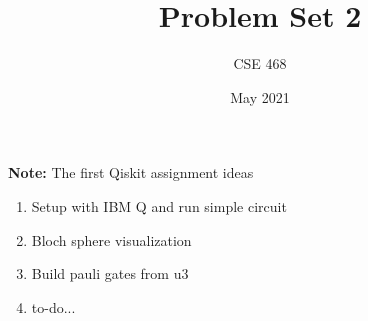 \documentclass[12pt]{article}
\title{Problem Set 2}
\author{CSE 468}
\date{May 2021}
\begin{document}
\maketitle

\noindent \textbf{Note:} The first Qiskit assignment ideas

\begin{enumerate}[font=\bfseries]
    \item Setup with IBM Q and run simple circuit
    \item Bloch sphere visualization
    \item Build pauli gates from u3
    \item to-do...
\end{enumerate}
\end{document}
